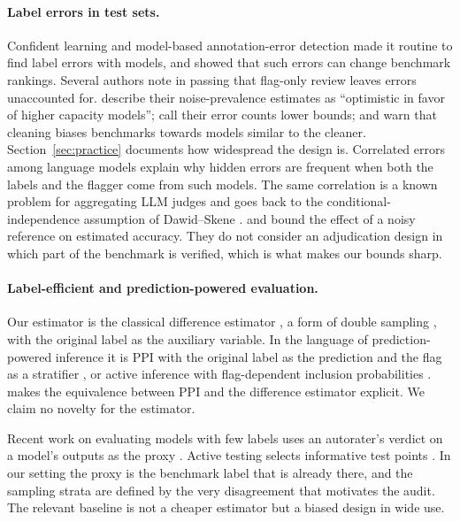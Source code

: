 \paragraph{Label errors in test sets.} Confident learning \citep{northcutt2021confident} and model-based annotation-error detection \citep{klie2023annotation,chong2022detecting} made it routine to find label errors with models, and \citet{northcutt2021pervasive} showed that such errors can change benchmark rankings. Several authors note in passing that flag-only review leaves errors unaccounted for. \citet{northcutt2021pervasive} describe their noise-prevalence estimates as ``optimistic in favor of higher capacity models''; \citet{vendrow2025do} call their error counts lower bounds; and \citet{chong2022detecting} warn that cleaning biases benchmarks towards models similar to the cleaner. Section~\ref{sec:practice} documents how widespread the design is. Correlated errors among language models \citep{kim2025correlated} explain why hidden errors are frequent when both the labels and the flagger come from such models. The same correlation is a known problem for aggregating LLM judges \citep{balasubramanian2026dependence} and goes back to the conditional-independence assumption of Dawid--Skene \citep{dawid1979maximum}. \citet{lam2003evaluating} and \citet{chavoshi2026impact} bound the effect of a noisy reference on estimated accuracy. They do not consider an adjudication design in which part of the benchmark is verified, which is what makes our bounds sharp.

\paragraph{Label-efficient and prediction-powered evaluation.} Our estimator is the classical difference estimator \citep{cassel1976some,sarndal1992model}, a form of double sampling \citep{tenenbein1970double,neyman1938contribution}, with the original label as the auxiliary variable. In the language of prediction-powered inference it is PPI \citep{angelopoulos2023prediction,angelopoulos2026ppi} with the original label as the prediction and the flag as a stratifier \citep{fisch2024stratified}, or active inference with flag-dependent inclusion probabilities \citep{zrnic2024active}. \citet{mozer2026ppi} makes the equivalence between PPI and the difference estimator explicit. We claim no novelty for the estimator.

Recent work on evaluating models with few labels uses an autorater's verdict on a model's outputs as the proxy \citep{boyeau2025autoeval,chatzi2024prediction,eyre2025regression,fogliato2024framework,chen2026efficient}. Active testing selects informative test points \citep{sawade2010active,kossen2021active}. In our setting the proxy is the benchmark label that is already there, and the sampling strata are defined by the very disagreement that motivates the audit. The relevant baseline is not a cheaper estimator but a biased design in wide use.
